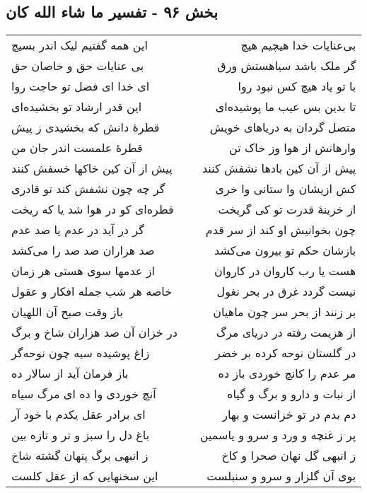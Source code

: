 \begin{center}
\section*{بخش ۹۶ - تفسیر ما شاء الله کان}
\label{sec:sh096}
\begin{longtable}{l p{0.5cm} r}
این همه گفتیم لیک اندر بسیچ
&&
بی‌عنایات خدا هیچیم هیچ
\\
بی عنایات حق و خاصان حق
&&
گر ملک باشد سیاهستش ورق
\\
ای خدا ای فضل تو حاجت روا
&&
با تو یاد هیچ کس نبود روا
\\
این قدر ارشاد تو بخشیده‌ای
&&
تا بدین بس عیب ما پوشیده‌ای
\\
قطرهٔ دانش که بخشیدی ز پیش
&&
متصل گردان به دریاهای خویش
\\
قطرهٔ علمست اندر جان من
&&
وارهانش از هوا وز خاک تن
\\
پیش از آن کین خاکها خسفش کنند
&&
پیش از آن کین بادها نشفش کنند
\\
گر چه چون نشفش کند تو قادری
&&
کش ازیشان وا ستانی وا خری
\\
قطره‌ای کو در هوا شد یا که ریخت
&&
از خزینهٔ قدرت تو کی گریخت
\\
گر در آید در عدم یا صد عدم
&&
چون بخوانیش او کند از سر قدم
\\
صد هزاران ضد ضد را می‌کشد
&&
بازشان حکم تو بیرون می‌کشد
\\
از عدمها سوی هستی هر زمان
&&
هست یا رب کاروان در کاروان
\\
خاصه هر شب جمله افکار و عقول
&&
نیست گردد غرق در بحر نغول
\\
باز وقت صبح آن اللهیان
&&
بر زنند از بحر سر چون ماهیان
\\
در خزان آن صد هزاران شاخ و برگ
&&
از هزیمت رفته در دریای مرگ
\\
زاغ پوشیده سیه چون نوحه‌گر
&&
در گلستان نوحه کرده بر خضر
\\
باز فرمان آید از سالار ده
&&
مر عدم را کانچ خوردی باز ده
\\
آنچ خوردی وا ده ای مرگ سیاه
&&
از نبات و دارو و برگ و گیاه
\\
ای برادر عقل یکدم با خود آر
&&
دم بدم در تو خزانست و بهار
\\
باغ دل را سبز و تر و تازه بین
&&
پر ز غنچه و ورد و سرو و یاسمین
\\
ز انبهی برگ پنهان گشته شاخ
&&
ز انبهی گل نهان صحرا و کاخ
\\
این سخنهایی که از عقل کلست
&&
بوی آن گلزار و سرو و سنبلست
\\

\end{longtable}
\end{center}
